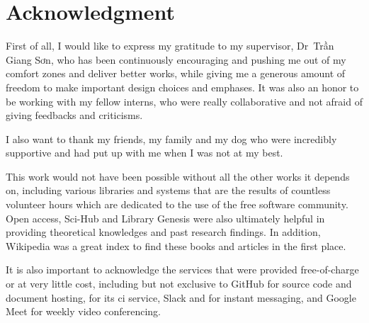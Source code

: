 \chapter{Acknowledgment}
First of all, I would like to express my gratitude to my supervisor,
Dr~{Trần Giang Sơn}, who has been continuously
encouraging and pushing me out of my comfort zones and deliver better works,
while giving me a generous amount of freedom to make important design choices
and emphases.  It was also an honor to be working with my fellow interns,
who were really collaborative and not afraid of giving feedbacks and criticisms.

I also want to thank my friends, my family and my dog who were incredibly
supportive and had put up with me when I was not at my best.

This work would not have been possible without all the other works it depends
on, including various libraries and systems that are the results of countless
volunteer hours which are dedicated to the use of the free software community.
Open access, Sci-Hub and Library Genesis were also ultimately helpful
in providing theoretical knowledges and past research findings.  In addition,
Wikipedia was a great index to find these books and articles in the first place.

It is also important to acknowledge the services that were provided
free-of-charge or at very little cost, including but not exclusive to
GitHub for source code and document hosting,  for its
\gls{ci} service, Slack and  for instant messaging,
and Google Meet for weekly video conferencing.
